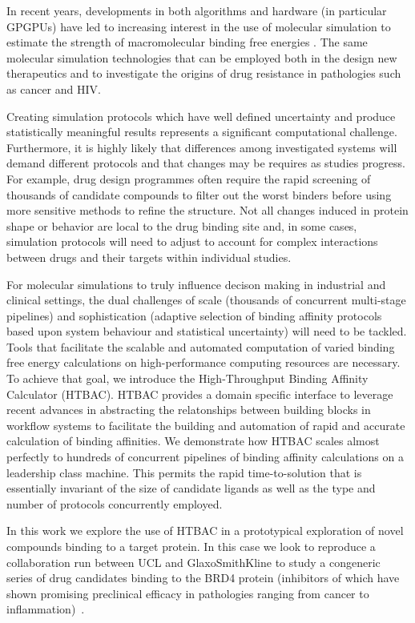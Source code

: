 In recent years, developments in both algorithms and hardware (in particular 
GPGPUs) have led to increasing interest in the use of molecular simulation to 
estimate the strength of macromolecular binding free energies \cite{DeVivo2016}. 
The same molecular simulation technologies that can be employed both in the
design new therapeutics and to investigate the origins of drug resistance in 
pathologies such as cancer and HIV. 

Creating simulation protocols which have well defined uncertainty and produce
statistically meaningful results represents a significant computational challenge. 
Furthermore, it is highly likely that differences among investigated systems will 
demand different protocols and that changes may be requires as studies progress. 
For example, drug design programmes often require the rapid screening of thousands 
of candidate compounds to filter out the worst binders before using more sensitive 
methods to refine the structure. 
Not all changes induced in protein shape or behavior are local to the drug binding 
site and, in some cases, simulation protocols will need to adjust to account for 
complex interactions between drugs and their targets within individual studies.

For molecular simulations to truly influence decison making in industrial and 
clinical settings, the dual challenges of
scale (thousands of concurrent multi-stage pipelines) and sophistication
(adaptive selection of binding affinity protocols based upon system behaviour and statistical uncertainty) will need to be tackled. 
Tools that facilitate the scalable and automated computation of varied binding 
free energy calculations on high-performance computing resources are necessary. 
To achieve that goal, we introduce the High-Throughput Binding Affinity Calculator 
(HTBAC).
HTBAC provides a domain specific interface to leverage recent advances in abstracting 
the relatonships between building blocks in workflow systems to facilitate the building 
and automation of rapid and accurate calculation of binding affinities.
We demonstrate how HTBAC scales almost perfectly to hundreds of concurrent
pipelines of binding affinity calculations on a leadership class machine. 
This permits the rapid time-to-solution that is essentially invariant of the size
of candidate ligands as well as the type and number of protocols concurrently
employed.

In this work we explore the use of HTBAC in a prototypical exploration of novel 
compounds binding to a target protein.
In this case we look to reproduce a collaboration run between UCL and GlaxoSmithKline to study a congeneric series of drug candidates binding to the BRD4 protein (inhibitors of which have shown promising preclinical efficacy in pathologies ranging from cancer to
inflammation)~\cite{Wan2017brd4}.


